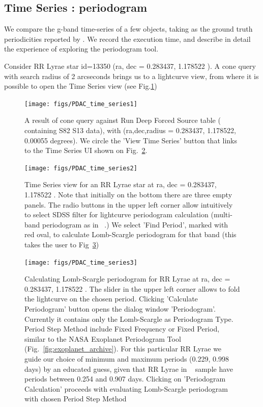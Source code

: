 \documentclass[fleqn,usenatbib]{mnras} %
\begin{document}
\subsection{Time Series : periodogram}
\label{sec:periodogram}

We compare the g-band time-series of a few objects, taking as the ground truth periodicities reported by \cite{sesar2010}. We record the execution time, and describe in detail the experience of exploring the periodogram tool.   

Consider RR Lyrae star id=13350  (ra, dec = 0.283437, 1.178522 ). A cone query with search radius of 2 arcseconds brings us to a lightcurve view, from where it is possible to open the Time Series view (see Fig.\ref{fig:time_series1})


\begin{figure}
\texttt{[image: figs/PDAC\_time\_series1]}
\caption{A result of cone query against Run Deep Forced Source table ( containing S82 S13 data), with (ra,dec,radius = 0.283437, 1.178522, 0.00055 degrees). We circle the 'View Time Series' button that links to the Time Series UI  shown on Fig.~\ref{fig:time_series2}. }
\label{fig:time_series1}
\end{figure}

\begin{figure}
\texttt{[image: figs/PDAC\_time\_series2]}
\caption{Time Series view for an RR Lyrae star at ra, dec = 0.283437, 1.178522 . Note that initially on the bottom there are three empty panels. The radio buttons in the upper left corner allow intuitively to select SDSS filter for lightcurve periodogram calculation (multi-band periodogram as in ~\citep{vanderplas2015}.) We select 'Find Period', marked with red oval, to calculate Lomb-Scargle periodogram for that band (this takes the user to Fig~\ref{fig:time_series3}) }
\label{fig:time_series2}
\end{figure}


\begin{figure}
\texttt{[image: figs/PDAC\_time\_series3]}
\caption{Calculating Lomb-Scargle periodogram for RR Lyrae at  ra, dec = 0.283437, 1.178522 . The slider in the upper left corner allows to fold the lightcurve on the chosen period. Clicking 'Calculate Periodogram' button opens the dialog window 'Periodogram'. Currently it contains only the Lomb-Scargle as Periodogram Type. Period Step Method include Fixed Frequency or Fixed Period, similar to the NASA Exoplanet Periodogram Tool (Fig.~\ref{fig:exoplanet_archive}). For this particular RR Lyrae we guide our choice of minimum and maximum periods (0.229, 0.998 days) by an educated guess, given that RR Lyrae in ~\citep{sesar2010} sample have periods between  0.254 and 0.907 days. Clicking on 'Periodogram Calculation' proceeds with evaluating Lomb-Scargle periodogram with chosen Period Step Method }
\label{fig:time_series3}
\end{figure}
\end{document}
